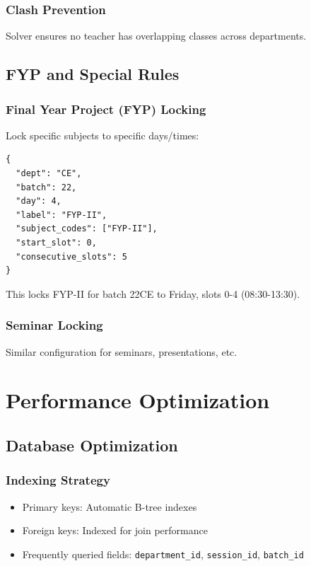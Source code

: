 \documentclass[12pt,a4paper]{article}
\begin{document}
\subsubsection{Clash Prevention}
Solver ensures no teacher has overlapping classes across departments.

\subsection{FYP and Special Rules}

\subsubsection{Final Year Project (FYP) Locking}
Lock specific subjects to specific days/times:

\begin{verbatim}
{
  "dept": "CE",
  "batch": 22,
  "day": 4,
  "label": "FYP-II",
  "subject_codes": ["FYP-II"],
  "start_slot": 0,
  "consecutive_slots": 5
}
\end{verbatim}

This locks FYP-II for batch 22CE to Friday, slots 0-4 (08:30-13:30).

\subsubsection{Seminar Locking}
Similar configuration for seminars, presentations, etc.

\section{Performance Optimization}

\subsection{Database Optimization}

\subsubsection{Indexing Strategy}
\begin{itemize}
    \item Primary keys: Automatic B-tree indexes
    \item Foreign keys: Indexed for join performance
    \item Frequently queried fields: \texttt{department\_id}, \texttt{session\_id}, \texttt{batch\_id}
\end{itemize}
\end{document}
